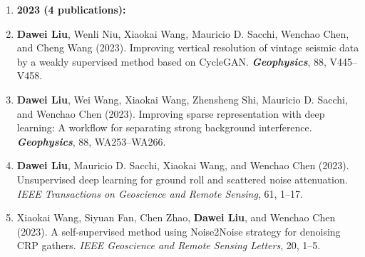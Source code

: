 \documentclass[11pt,a4paper]{article}
\begin{document}
\begin{enumerate}[leftmargin=1.5em, itemsep=0pt, topsep=2pt]
    \item[] \hspace{-25pt} \textbf{2023 (4 publications):}
    \item \textbf{Dawei Liu}, Wenli Niu, Xiaokai Wang, Mauricio D. Sacchi, Wenchao Chen, and Cheng Wang (2023). Improving vertical resolution of vintage seismic data by a weakly supervised method based on CycleGAN. {\bf \em Geophysics}, 88, V445--V458.
    \item \textbf{Dawei Liu}, Wei Wang, Xiaokai Wang, Zhensheng Shi, Mauricio D. Sacchi, and Wenchao Chen (2023). Improving sparse representation with deep learning: A workflow for separating strong background interference. {\bf \em Geophysics}, 88, WA253--WA266.
    \item \textbf{Dawei Liu}, Mauricio D. Sacchi, Xiaokai Wang, and Wenchao Chen (2023). Unsupervised deep learning for ground roll and scattered noise attenuation. {\em IEEE Transactions on Geoscience and Remote Sensing}, 61, 1--17.
    \item Xiaokai Wang, Siyuan Fan, Chen Zhao, \textbf{Dawei Liu}, and Wenchao Chen (2023). A self-supervised method using Noise2Noise strategy for denoising CRP gathers. {\em IEEE Geoscience and Remote Sensing Letters}, 20, 1--5.
    

\end{enumerate}
\end{document}
